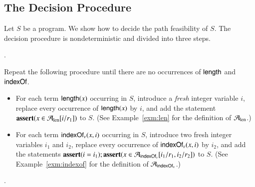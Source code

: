 \subsection{The Decision Procedure}

%
Let $S$  be a {\slint} program. We show how to decide the path feasibility of $S$. The decision procedure is nondeterministic and divided into three steps. 
%

\medskip
{}.

\smallskip

Repeat the following procedure until there are no occurrences of $\mathsf{length}$ and $\mathsf{indexOf}$.
\begin{itemize}
\item For each term $\mathsf{length}(x)$ occurring in $S$, introduce a \emph{fresh} integer variable $i$, replace every occurrence of $\mathsf{length}(x)$ by $i$, and add the statement $\textbf{assert}(x \in \mathcal{A}_{\rm len}[i/r_1])$ to $S$. (See Example~\ref{exm:len} for the definition of $\mathcal{A}_{\rm len}$.)  
%
\item 
For each term $\mathsf{indexOf}_v(x, i)$ occurring in $S$, introduce two fresh integer variables $i_1$ and $i_2$, replace every occurrence of $\mathsf{indexOf}_v(x, i)$ by $i_2$, and add the statements $\textbf{assert}(i=i_1); \textbf{assert}(x \in \mathcal{A}_{\mathsf{indexOf}_v}[i_1/r_1, i_2/r_2])$ to $S$.  (See Example~\ref{exm:indexof} for the definition of $\mathcal{A}_{\rm \mathsf{indexOf}_v}$.)
\end{itemize}
%

\medskip
{}.

\smallskip

